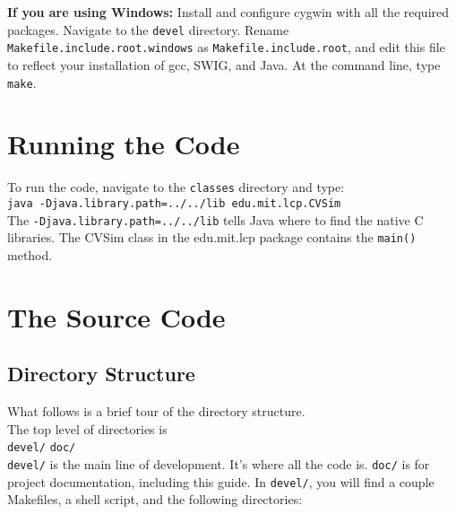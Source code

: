 \documentclass[12pt]{article}
\begin{document}
\noindent \textbf{If you are using Windows:} Install and configure cygwin with all
the required packages. Navigate to the \texttt{devel}
directory. Rename \texttt{Makefile.include.root.windows} as
\texttt{Makefile.include.root}, and edit this file to reflect your installation of
gcc, SWIG, and Java. At the command line, type \texttt{make}.



\section{Running the Code}

To run the code, navigate to the \texttt{classes} directory and type: \\

\noindent \texttt{java -Djava.library.path=../../lib edu.mit.lcp.CVSim} \\

\noindent The \texttt{-Djava.library.path=../../lib} tells Java where to find
the native C libraries. The CVSim class in the edu.mit.lcp package
contains the \texttt{main()} method.



\section{The Source Code}

\subsection{Directory Structure}

What follows is a brief tour of the directory structure. \\ 

\noindent The top level of directories is \\

\noindent \texttt{devel/} \hspace{1cm}
          \texttt{doc/}  \\

\noindent \texttt{devel/} is the main line of development. It's where
all the code is. \texttt{doc/} is for project documentation, including
this guide. In \texttt{devel/}, you will find a couple Makefiles, a shell
script, and the following directories: \\
\end{document}
